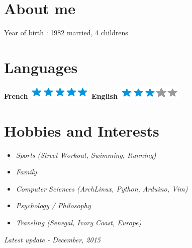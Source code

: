 \documentclass[]{friggeri-cv}
\begin{document}
\begin{aside}
  \section{About me}
    Year of birth : 1982
    married, 4 childrens 
    ~
  \section{Languages}
    \textbf{French}\includegraphics[scale=0.40]{img/5stars.png}
    \textbf{English}\includegraphics[scale=0.40]{img/3stars.png}
\end{aside}

\section{Hobbies and Interests}
\begin {itemize}
    \item \emph {Sports (Street Workout, Swimming, Running)}
    \item \emph {Family}
    \item \emph {Computer Sciences (ArchLinux, Python, Arduino, Vim)}
    \item \emph {Psychology / Philosophy}
    \item \emph {Traveling (Senegal, Ivory Coast, Europe)}
\end {itemize}
\begin{flushright}
\emph{Latest update - December, 2015}
\end{flushright}
\end{document}
